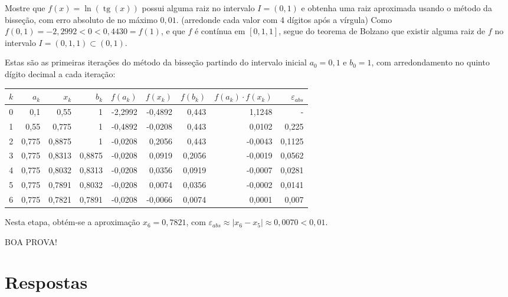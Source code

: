 \documentclass[12pt,a4paper]{article}
\newcommand*\tg{\operatorname{tg}}
\begin{document}
\begin{ExerciseList}
\Exercise[title={2,5}] Mostre que $f(x) = \ln(\tg(x))$ possui alguma raiz no intervalo $I = (0, 1)$ e obtenha uma raiz aproximada usando o método da bisseção, com erro absoluto de no máximo $0,01$.
(arredonde cada valor com 4 dígitos após a vírgula)
\Answer Como $f(0,1) = -2,2992 < 0 < 0,4430 = f(1)$, e que $f$ é contínua em $[0,1, 1]$, segue do teorema de Bolzano que existir alguma raiz de $f$ no intervalo $I = (0,1, 1) \subset (0, 1)$.

Estas são as primeiras iterações do método da bisseção partindo do intervalo inicial $a_0 = 0,1$ e $b_0 = 1$, com arredondamento no quinto dígito decimal a cada iteração:
\begin{center}
\begin{tabular}{|r|r|r|r|r|r|r|r|r|}
\hline
$k$ & $a_k$ & $x_k$ & $b_k$ & $f(a_k)$ & $f(x_k)$ & $f(b_k)$ & $f(a_k)\cdot f(x_k)$ & $\varepsilon_{abs}$ \\
\hline
0 & 0,1 & 0,55 & 1 & -2,2992 & -0,4892 & 0,443 & 1,1248 & -\\\hline
1 & 0,55 & 0,775 & 1 & -0,4892 & -0,0208 & 0,443 & 0,0102 & 0,225\\\hline
2 & 0,775 & 0,8875 & 1 & -0,0208 & 0,2056 & 0,443 & -0,0043 & 0,1125\\\hline
3 & 0,775 & 0,8313 & 0,8875 & -0,0208 & 0,0919 & 0,2056 & -0,0019 & 0,0562\\\hline
4 & 0,775 & 0,8032 & 0,8313 & -0,0208 & 0,0356 & 0,0919 & -0,0007 & 0,0281\\\hline
5 & 0,775 & 0,7891 & 0,8032 & -0,0208 & 0,0074 & 0,0356 & -0,0002 & 0,0141\\\hline
6 & 0,775 & 0,7821 & 0,7891 & -0,0208 & -0,0066 & 0,0074 & 0,0001 & 0,007\\\hline
\end{tabular}
\end{center}
\medskip
Nesta etapa, obtém-se a aproximação $x_6 = 0,7821$, com $\varepsilon_{abs} \approx |x_6-x_5| \approx 0,0070 < 0,01$.
\end{ExerciseList}

\vspace{0.5cm}
\begin{center}
BOA PROVA!
\end{center}

\newpage
\restoregeometry
\section*{Respostas}
\shipoutAnswer
\end{document}

